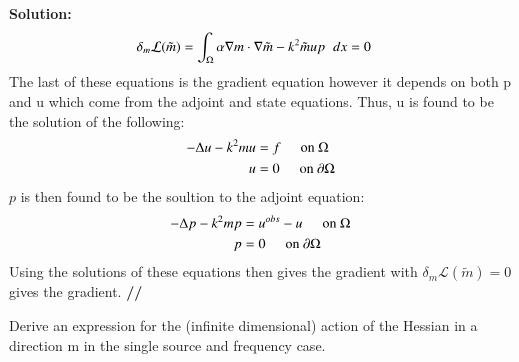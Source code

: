 \documentclass[11pt]{article}
\newenvironment{solution}{\begin{trivlist}\item[]{\bf Solution:}}
                      {\textbf{//} \end{trivlist}}
\begin{document}
\begin{enumerate}
\begin{solution}
\begin{align}
\delta_m\mathcal{L}(\tilde{m}) &= \int_{\Omega} \alpha \nabla m \cdot
 \nabla\tilde{m} - k^2\tilde{m}up \hspace{2 mm} dx = 0 \nonumber 
\end{align}
The last of these equations is the gradient equation however it depends
 on both p and u which come from the adjoint and state
 equations. Thus, u is found to be the solution of the
 following: 
\begin{align}
-\Delta u - k^2mu &= f\hspace{5 mm} \text{on } \Omega \nonumber \\
u &= 0 \hspace{5 mm} \text{on } \partial\Omega \nonumber
\end{align}
$p$ is then found to be the soultion to the adjoint equation:
\begin{align}
-\Delta p - k^2mp &= u^{obs} - u \hspace{5 mm} \text{on } \Omega \nonumber \\
p &= 0 \hspace{5 mm} \text{on } \partial\Omega \nonumber
\end{align}
Using the solutions of these equations then gives the gradient with
 $\delta_m\mathcal{L}(\tilde{m}) = 0$ gives the gradient. 
\end{solution}

\item[(b)] Derive an expression for the (infinite dimensional) action of
	   the Hessian in a direction m in the single source and frequency case.


\end{enumerate}
\end{document}
